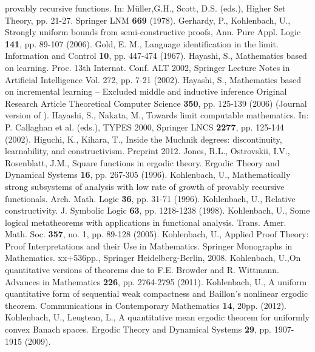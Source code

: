 \documentclass[1p]{elsarticle}
\theoremstyle{plain}
\theoremstyle{definition}
\theoremstyle{remark}
\theoremstyle{definition}
\begin{document}
{\begin{thebibliography}{00}
provably recursive functions. In: M\"uller,G.H., Scott, D.S. (eds.),
Higher Set Theory, pp. 21-27. Springer LNM {\bf 669} (1978).
Gerhardy, P., Kohlenbach, U.,  
Strongly uniform bounds from semi-constructive proofs, Ann. Pure Appl. 
Logic {\bf 141}, pp. 89-107 (2006).
 Gold, E. M., Language identification in the limit.
Information and Control {\bf 10}, pp. 447-474 (1967).
 Hayashi, S., Mathematics based on learning.
Proc. 13th Internat. Conf. ALT 2002, Springer Lecture Notes in 
Artificial Intelligence Vol. 272, pp. 7-21 (2002).
 Hayashi, S., Mathematics based on incremental learning -- 
Excluded middle and inductive inference Original Research Article
Theoretical Computer Science {\bf 350}, pp. 125-139 (2006) (Journal version 
of \cite{Hayashi02}).
 Hayashi, S., Nakata, M., Towards limit computable 
mathematics. In: P. Callaghan et al. (eds.), TYPES 2000, Springer 
LNCS {\bf 2277}, pp. 125-144 (2002).
 Higuchi, K., Kihara, T., Inside the Muchnik 
degrees: discontinuity, learnability, and constructivism. Preprint 2012. 
 Jones, R.L., Ostrovskii, I.V., Rosenblatt, J.M., 
Square functions in ergodic theory. Ergodic Theory and Dynamical 
Systems {\bf 16}, pp. 267-305 (1996).
 Kohlenbach, U., Mathematically strong subsystems of analysis with low rate of growth of provably recursive functionals. Arch. Math. Logic {\bf 36}, pp. 31-71 (1996). 
 Kohlenbach, U., Relative constructivity.
J. Symbolic Logic {\bf 63}, pp. 1218-1238 (1998). 
 Kohlenbach, U., Some logical
metatheorems with applications in functional analysis. 
Trans. Amer. Math. Soc. {\bf 357}, no. 1, pp. 89-128 (2005).
 Kohlenbach, U., Applied Proof Theory: 
Proof Interpretations and their Use in Mathematics. 
Springer Monographs in Mathematics. xx+536pp., Springer 
Heidelberg-Berlin, 2008.
 Kohlenbach, U.,On quantitative 
versions of  theorems due to F.E. Browder and R. Wittmann. Advances in 
Mathematics {\bf 226}, pp. 2764-2795 (2011).   
 Kohlenbach, U., A uniform quantitative form of 
sequential weak compactness and Baillon's nonlinear ergodic theorem. 
Communications in Contemporary Mathematics {\bf 14}, 20pp. (2012). 
 Kohlenbach, U., Leu\c{s}tean, L., A 
quantitative mean ergodic theorem for uniformly convex Banach spaces. 
Ergodic Theory and Dynamical Systems {\bf 29}, pp. 1907-1915 (2009). 

\end{thebibliography}}
\end{document}
